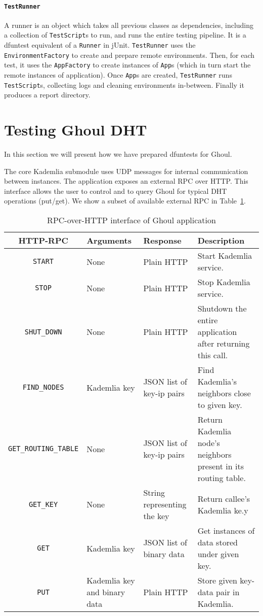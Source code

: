 \paragraph{\texttt{TestRunner}} A runner is an object which takes all previous
classes as dependencies, including a collection of \texttt{TestScript}s to run,
and runs the entire testing pipeline. It is a dfuntest equivalent of a
\texttt{Runner} in jUnit.
\texttt{TestRunner} uses the \texttt{EnvironmentFactory} to
create and prepare remote environments. Then, for each test, it uses the
\texttt{AppFactory} to create instances of \texttt{App}s (which in turn start
the remote instances of application). Once \texttt{App}s are created,
\texttt{TestRunner} runs \texttt{TestScript}s, collecting logs and cleaning
environments in-between. Finally it produces a report directory.


\section{Testing Ghoul DHT}\label{sec:exampl-test-kademl}
In this section we will present how we have prepared dfuntests for Ghoul.

The core Kademlia submodule uses UDP messages for internal communication between instances.
The application exposes an external RPC over HTTP.
This interface allows the user to control and to query Ghoul for typical DHT operations (put/get).
We show a subset of available external RPC in Table~\ref{tab:http_rpc}.

\begin{table}[tbp]
  \begin{tabular}{|c|p{3cm}|p{3.6cm}|p{3.4cm}|}
    \hline
    HTTP-RPC & Arguments & Response & Description \\
    \hline
    \texttt{START} & None & Plain HTTP & Start Kademlia service.\\
    \hline
    \texttt{STOP} & None & Plain HTTP  & Stop Kademlia service.\\
    \hline
    \texttt{SHUT\_DOWN} & None & Plain HTTP &
      Shutdown the entire application after returning this call.\\
    \hline
    \texttt{FIND\_NODES} & Kademlia key & JSON list of key-ip pairs &
      Find Kademlia's neighbors close to given key.\\
    \hline
    \texttt{GET\_ROUTING\_TABLE} & None & JSON list of key-ip pairs & Return
      Kademlia node's neighbors present in its routing table.\\
    \hline
    \texttt{GET\_KEY} & None & String representing the key & Return callee's
      Kademlia ke.y\\
    \hline
    \texttt{GET} & Kademlia key  & JSON list of binary data & Get instances of
    data stored under given key. \\
    \hline
    \texttt{PUT} & Kademlia key and binary data  & Plain HTTP & Store given
    key-data pair in Kademlia. \\
    \hline
  \end{tabular}
  \caption{RPC-over-HTTP interface of Ghoul application}
  \label{tab:http_rpc}
\end{table}

